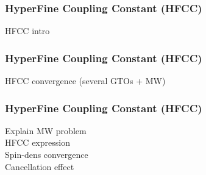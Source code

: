 \begin{frame}
\frametitle{HyperFine Coupling Constant (HFCC)}
\scriptsize
HFCC intro

\end{frame}

\begin{frame}
\frametitle{HyperFine Coupling Constant (HFCC)}
\scriptsize
HFCC convergence (several GTOs + MW)

\end{frame}

\begin{frame}
\frametitle{HyperFine Coupling Constant (HFCC)}
\scriptsize
Explain MW problem\\
HFCC expression\\
Spin-dens convergence\\
Cancellation effect

\end{frame}

